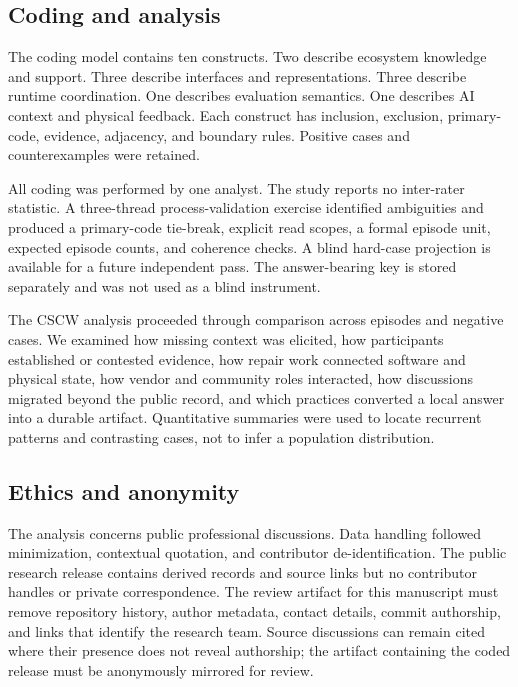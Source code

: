 \subsection{Coding and analysis}

The coding model contains ten constructs. Two describe ecosystem knowledge and support. Three describe interfaces and representations. Three describe runtime coordination. One describes evaluation semantics. One describes AI context and physical feedback. Each construct has inclusion, exclusion, primary-code, evidence, adjacency, and boundary rules. Positive cases and counterexamples were retained.

All coding was performed by one analyst. The study reports no inter-rater statistic. A three-thread process-validation exercise identified ambiguities and produced a primary-code tie-break, explicit read scopes, a formal episode unit, expected episode counts, and coherence checks. A blind hard-case projection is available for a future independent pass. The answer-bearing key is stored separately and was not used as a blind instrument.

The CSCW analysis proceeded through comparison across episodes and negative cases. We examined how missing context was elicited, how participants established or contested evidence, how repair work connected software and physical state, how vendor and community roles interacted, how discussions migrated beyond the public record, and which practices converted a local answer into a durable artifact. Quantitative summaries were used to locate recurrent patterns and contrasting cases, not to infer a population distribution.

\subsection{Ethics and anonymity}

The analysis concerns public professional discussions. Data handling followed minimization, contextual quotation, and contributor de-identification. The public research release contains derived records and source links but no contributor handles or private correspondence. The review artifact for this manuscript must remove repository history, author metadata, contact details, commit authorship, and links that identify the research team. Source discussions can remain cited where their presence does not reveal authorship; the artifact containing the coded release must be anonymously mirrored for review.
